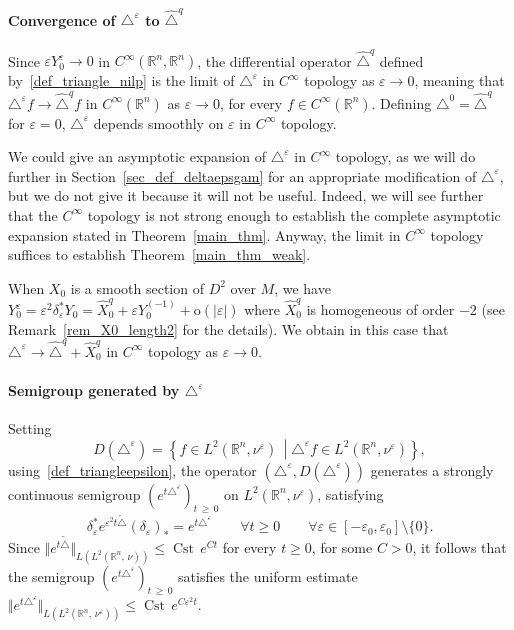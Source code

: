 \documentclass[AHL,Unicode,published]{cedram}
\newcommand*\R{\mathbb{R}}
\newcommand{\rmo}{\mathrm{o}}
\DeclareMathOperator{\Cst}{Cst}
\renewcommand{\geq}{\geqslant}
\renewcommand{\leq}{\leqslant}
\let\oldforall\forall
\renewcommand*{\forall}{\mathrel{\oldforall}}
\begin{document}
\paragraph{Convergence of $\triangle^\varepsilon$ to $\widehat{\triangle}^{q}$}
Since $\varepsilon Y^\varepsilon_0 \rightarrow 0$ in $C^\infty(\R^n,\R^n)$, the differential operator $\widehat{\triangle}^{q}$ defined by~\eqref{def_triangle_nilp} is the limit of $\triangle^\varepsilon$ in $C^\infty$ topology as $\varepsilon\rightarrow 0$, meaning that $\triangle^\varepsilon f\rightarrow \widehat{\triangle}^{q} f$ in $C^\infty(\R^n)$ as $\varepsilon\rightarrow 0$, for every $f\in C^\infty(\R^n)$. Defining $\triangle^0=\widehat{\triangle}^{q}$ for $\varepsilon=0$, $\triangle^\varepsilon$ depends smoothly on $\varepsilon$ in $C^\infty$ topology.

We could give an asymptotic expansion of $\triangle^\varepsilon$ in $C^\infty$ topology, as we will do further in Section~\ref{sec_def_deltaepsgam} for an appropriate modification of $\triangle^\varepsilon$, but we do not give it because it will not be useful. Indeed, we will see further that the $C^\infty$ topology is not strong enough to establish the complete asymptotic expansion stated in Theorem~\ref{main_thm}. Anyway, the limit in $C^\infty$ topology suffices to establish Theorem~\ref{main_thm_weak}.


When $X_0$ is a smooth section of $D^2$ over $M$, we have $Y_0^\varepsilon = \varepsilon^2\delta_\varepsilon^* Y_0 = \widehat{X}_0^{q} + \varepsilon Y_0^{(-1)} + \rmo(\vert\varepsilon\vert)$ where $\widehat{X}_0^{q}$ is homogeneous of order $-2$ (see Remark~\ref{rem_X0_length2} for the details). We obtain in this case that $\triangle^\varepsilon\rightarrow \widehat{\triangle}^{q} +\widehat{X}_0^{q}$ in $C^\infty$ topology as $\varepsilon\rightarrow 0$.

\goodbreak
\paragraph{Semigroup generated by $\triangle^\varepsilon$} Setting
\[
D(\triangle^\varepsilon) = \left\{ f\in L^2\left(\R^n,\nu^\varepsilon\right) \, \middle| \triangle^\varepsilon f \in L^2\left(\R^n,\nu^\varepsilon\right) \right\},
\]
using~\eqref{def_triangleepsilon}, the operator $(\triangle^\varepsilon,D(\triangle^\varepsilon))$ generates a strongly continuous semigroup $(e^{t\triangle^\varepsilon})_{t\,\geq\,0}$ on $L^2(\R^n,\nu^\varepsilon)$, satisfying
\[
\delta_\varepsilon^*e^{\varepsilon^2 t\widetilde\triangle}(\delta_\varepsilon)_* = e^{t\triangle^\varepsilon}\qquad \forall t\geq 0\qquad \forall \varepsilon\in[-\varepsilon_0,\varepsilon_0]\setminus\{0\}.
\]
Since $\Vert e^{t\widetilde\triangle}\Vert_{L(L^2(\R^n,\,\nu))} \leq \Cst\, e^{C t}$ for every $t\geq 0$, for some $C>0$, it follows that the semigroup $(e^{t\triangle^\varepsilon})_{t\,\geq \,0}$ satisfies the uniform estimate $\Vert e^{t\triangle^\varepsilon}\Vert_{L(L^2(\R^n,\,\nu^\varepsilon))} \leq \Cst\, e^{C\varepsilon^2 t}$.
\end{document}
